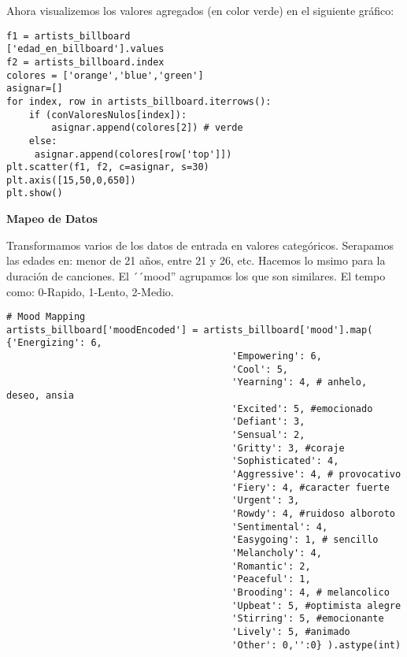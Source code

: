 \documentclass{article}
\begin{document}
Ahora visualizemos los valores agregados (en color verde) en el siguiente gráfico:
\begin{lstlisting}
f1 = artists_billboard
['edad_en_billboard'].values
f2 = artists_billboard.index
colores = ['orange','blue','green']
asignar=[]
for index, row in artists_billboard.iterrows():    
    if (conValoresNulos[index]):
        asignar.append(colores[2]) # verde
    else:
     asignar.append(colores[row['top']])
plt.scatter(f1, f2, c=asignar, s=30)
plt.axis([15,50,0,650])
plt.show()
\end{lstlisting}






\textbf{Mapeo de Datos}



Transformamos varios de los datos de entrada en valores categóricos. Serapamos las edades en: menor de 21 años, entre 21 y 26, etc. Hacemos lo msimo para la duración de canciones. El ´´mood'' agrupamos los que son similares. El tempo como: 0-Rapido, 1-Lento, 2-Medio.

\begin{lstlisting}
# Mood Mapping
artists_billboard['moodEncoded'] = artists_billboard['mood'].map( {'Energizing': 6, 
                                        'Empowering': 6,
                                        'Cool': 5, 
                                        'Yearning': 4, # anhelo, deseo, ansia
                                        'Excited': 5, #emocionado
                                        'Defiant': 3, 
                                        'Sensual': 2, 
                                        'Gritty': 3, #coraje 
                                        'Sophisticated': 4,
                                        'Aggressive': 4, # provocativo
                                        'Fiery': 4, #caracter fuerte
                                        'Urgent': 3, 
                                        'Rowdy': 4, #ruidoso alboroto
                                        'Sentimental': 4,
                                        'Easygoing': 1, # sencillo
                                        'Melancholy': 4, 
                                        'Romantic': 2, 
                                        'Peaceful': 1, 
                                        'Brooding': 4, # melancolico
                                        'Upbeat': 5, #optimista alegre
                                        'Stirring': 5, #emocionante
                                        'Lively': 5, #animado
                                        'Other': 0,'':0} ).astype(int)

\end{lstlisting}
\end{document}
